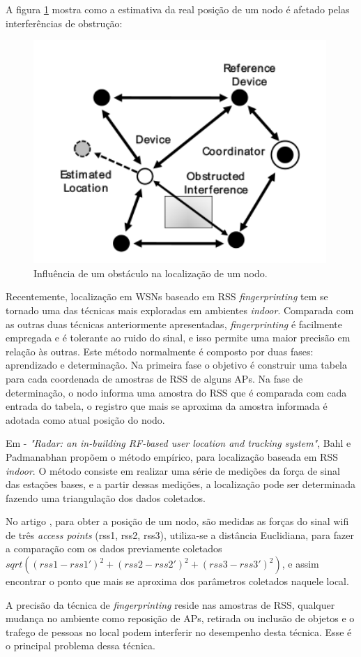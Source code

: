 A figura \ref{fig:rsserror} mostra como a estimativa da real posição de um nodo é afetado pelas interferências de obstrução:
	\begin{figure}[ht]
	\centering
	\includegraphics[scale=0.5]{images/rsserror.png}
	\caption{Influência de um obstáculo na localização de um nodo\cite{rss1}. }
	\label{fig:rsserror}
	\end{figure}
	
	Recentemente, localização em WSNs baseado em RSS \textit{fingerprinting} tem se tornado uma das técnicas mais exploradas 
	em ambientes \textit{indoor}\cite{fingerPrint}\cite{wifiRadar}\cite{fingerPrint2}. Comparada com as outras duas técnicas
	anteriormente apresentadas, \textit{fingerprinting} é facilmente empregada 
	e é tolerante ao ruido do sinal, e isso permite uma maior precisão em relação às outras. Este método normalmente é composto por duas fases: 
	aprendizado e determinação. Na primeira fase o objetivo é construir uma tabela para cada coordenada de amostras de RSS 
	de alguns APs. Na fase de determinação, o nodo informa uma amostra do RSS que é comparada com cada entrada do tabela, o registro
	que mais se aproxima da amostra informada é adotada como atual posição do nodo.
	
   Em \cite{wifiRadar} - \textit{"Radar: an in-building RF-based user location and tracking system"}, Bahl e Padmanabhan propõem o método empírico,
   para localização baseada em RSS \textit{indoor}. O método consiste em realizar uma série de medições da força de sinal das estações bases, 
   e a partir dessas medições, a localização pode ser determinada fazendo uma triangulação dos dados coletados. 

  No artigo \cite{wifiRadar}, para obter a posição de um nodo, são medidas as forças do sinal wifi de três \textit{access points} (rss1, rss2, rss3), 
utiliza-se a distância Euclidiana, para fazer a comparação com os dados previamente coletados $sqrt((rss1-rss1')^{2}+(rss2-rss2')^{2}+(rss3-rss3')^{2})$, 
e assim encontrar o ponto que mais se aproxima dos parâmetros coletados naquele local. 
	
	A precisão da técnica de \textit{fingerprinting} reside nas amostras de RSS, qualquer mudança no ambiente como 
	reposição de APs, retirada ou inclusão de objetos e o trafego de pessoas no local podem interferir no desempenho desta técnica. 
	Esse é o principal problema dessa técnica.


